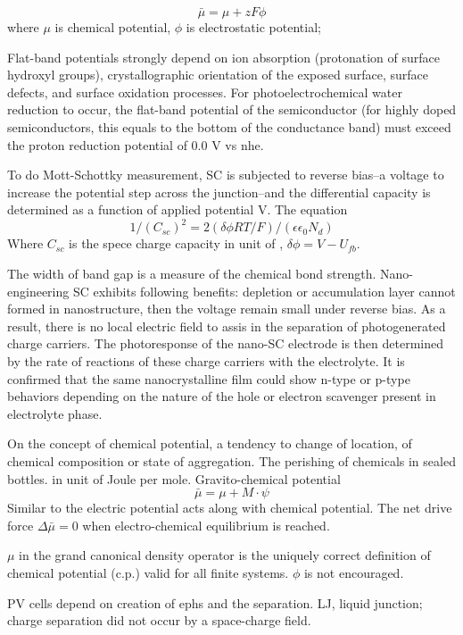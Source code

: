 \[
\bar{\mu} = \mu + zF\phi
\]
where $\mu$ is chemical potential, $\phi$ is electrostatic potential; 

Flat-band potentials strongly depend on ion absorption (protonation of surface hydroxyl groups), crystallographic orientation of the exposed surface, surface defects, and surface oxidation processes.\cite{Osterloh2008} For photoelectrochemical water reduction to occur, the flat-band potential of the semiconductor (for highly doped semiconductors, this equals to the bottom of the conductance band) must exceed the proton reduction potential of 0.0 V vs \gls{nhe}.

To do Mott-Schottky measurement, SC is subjected to reverse bias--a voltage to increase the potential step across the junction--and the differential capacity is determined as a function of applied potential V. The equation
\[
1/(C_{sc})^2 = 2(\delta\phi RT/F)/(\epsilon\epsilon_0 N_d)
\]
Where $C_{sc}$ is the spece charge capacity in unit of , $\delta\phi = V - U_{fb}$.

The width of band gap is a measure of the chemical bond strength.\cite{Gratzel2001} Nano-engineering SC exhibits following benefits: 
depletion or accumulation layer cannot formed in nanostructure, then the voltage remain small under reverse bias. As a result, there is no local electric field to assis in the separation of photogenerated charge carriers. The photoresponse of the nano-SC electrode is then determined by the rate of reactions of these charge carriers with the electrolyte. It is confirmed that the same nanocrystalline film could show n-type or p-type behaviors depending on the nature of the hole or electron scavenger present in electrolyte phase.\cite{Hodes1992}


On the concept of chemical potential, a tendency to change of location, of chemical composition or state of aggregation.\cite{Job2006} The perishing of chemicals in sealed bottles. in unit of Joule per mole. Gravito-chemical potential 
\[
\bar{\mu} = \mu + M\cdot\psi
\]
Similar to the electric potential acts along with chemical potential. 
The net drive force $\Delta\bar{\mu} = 0$ when electro-chemical equilibrium is reached. 

$\mu$ in the grand canonical density operator is the uniquely correct definition of chemical potential (c.p.) valid for all finite systems.\cite{Kaplan2006} $\phi$ is not encouraged. 

PV cells depend on creation of ephs and the separation.\cite{Hodes1992} LJ, liquid junction; charge separation did not occur by a space-charge field. 


